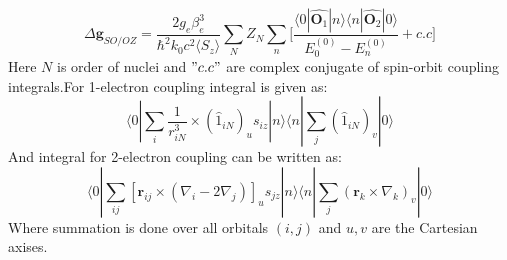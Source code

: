 \begin{equation}\label{eq:zeemanparamagn}
\Delta \pmb{g}_{SO/OZ}=\frac{2g_e\beta_e^3}{\hbar^2k_0c^2\langle S_z\rangle}\sum_N Z_N\sum_n\Bigg[ \frac{\langle0|\hat{\pmb{O}_1}|n\rangle\langle n|\hat{\pmb{O}_2}|0\rangle}{E_0^{(0)}-E_n^{(0)}}+c.c\Bigg]
\end{equation} 
Here $N$ is order of nuclei and $"c.c"$ are complex conjugate of spin-orbit coupling integrals.For 1-electron coupling integral is given as:
\begin{equation}\label{eq:oneel}
\langle 0|\sum_i\frac{1}{r^3_{iN}}\times(\hat1_{iN})_us_{iz}|n\rangle\langle n|\sum_j(\hat1_{iN})_v|0\rangle
\end{equation}
And integral for 2-electron coupling can be written as:
\begin{equation}\label{eq:oneel}
\langle 0|\sum_{ij}[\pmb{r}_{ij}\times(\nabla_i-2\nabla_j)]_us_{jz}|n\rangle\langle n|\sum_j(\pmb{r}_k\times\nabla_k)_v|0\rangle
\end{equation}
Where summation is done over all orbitals $(i,j)$ and $u,v$ are the Cartesian axises.
